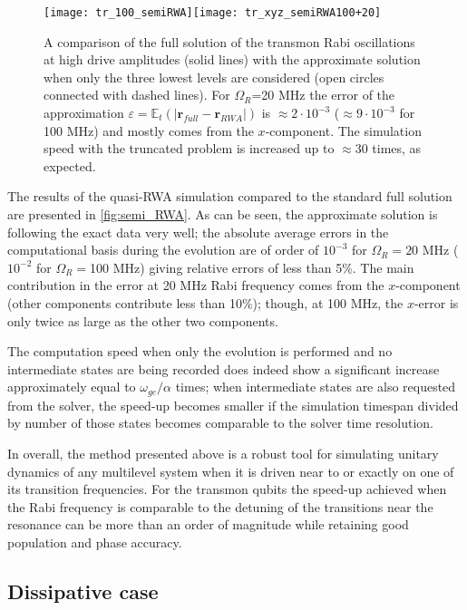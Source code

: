 \begin{figure}[t]
\centering
\texttt{[image: tr\_100\_semiRWA]}\texttt{[image: tr\_xyz\_semiRWA100+20]}
\caption{A comparison of the full solution of the transmon Rabi oscillations at high drive amplitudes (solid lines) with the approximate solution when only the three lowest levels are considered (open circles connected with dashed lines). For $\Omega_R$=20 MHz the error of the approximation $\varepsilon =\mathbb{E}_t(|\mathbf{r}_{full}-\mathbf{r}_{RWA}|)$ is $\approx 2\cdot10^{-3}$ ($\approx 9\cdot 10^{-3}$ for 100 MHz) and mostly comes from the $x$-component. The simulation speed with the truncated problem is increased up to $\approx$30 times, as expected.}
\label{fig:semi_RWA}
\end{figure}

The results of the quasi-RWA simulation compared to the standard full solution are presented in \autoref{fig:semi_RWA}. As can be seen, the approximate solution is following the exact data very well; the absolute average errors in the computational basis during the evolution are of order of $10^{-3}$ for $\Omega_R=20$ MHz  ($10^{-2}$ for $\Omega_R=$100 MHz) giving relative errors of less than 5\%. The main contribution in the error at 20 MHz Rabi frequency comes from the $x$-component (other components contribute less than 10\%); though, at 100 MHz, the $x$-error is only twice as large as the other two components. 

The computation speed when only the evolution is performed and no intermediate states are being recorded does indeed show a significant increase approximately equal to $\omega_{ge}/\alpha$ times; when intermediate states are also requested from the solver, the speed-up becomes smaller if the simulation timespan divided by number of those states becomes comparable to the solver time resolution. 

In overall, the method presented above is a robust tool for simulating unitary dynamics of any multilevel system when it is driven near to or exactly on one of its transition frequencies. For the transmon qubits the speed-up achieved when the Rabi frequency is comparable to the detuning of the transitions near the resonance can be more than an order of magnitude while retaining good population and phase accuracy.


\subsection{Dissipative case}

